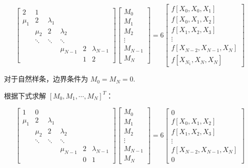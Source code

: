 \documentclass[lang=cn,a4paper,newtx,bibend=bibtex]{elegantpaper}
\begin{document}
\[
\begin{bmatrix}
  2 & 1 & & & & \\
  \mu_1 & 2 & \lambda_1 & & & \\
  & \mu_2 & 2 & \lambda_2 & &\\
  & \ddots & \ddots & \ddots & & \\
  & & & \mu_{N-1} & 2 & \lambda_{N-1} \\
  & & & & 1 & 2
\end{bmatrix}  
\begin{bmatrix}
  M_0 \\
  M_1 \\
  M_2 \\
  \vdots \\
  M_{N-1} \\
  M_N
\end{bmatrix}
 = 6
 \begin{bmatrix}
  f[X_0, X_0, X_1] \\
  f[X_0, X_1, X_2]\\
  f[X_1, X_2, X_3] \\
  \vdots \\
  f[X_{N-2}, X_{N-1}, X_N] \\
  f[X_{N_1}, X_N, X_N]
\end{bmatrix}
\]

对于自然样条，边界条件为 $M_0 = M_N = 0$.

根据下式求解 $[M_0, M_1, \cdots, M_N]^T$：

\[
\begin{bmatrix}
  1 & 0 & & & & \\
  \mu_1 & 2 & \lambda_1 & & & \\
  & \mu_2 & 2 & \lambda_2 & &\\
  & \ddots & \ddots & \ddots & & \\
  & & & \mu_{N-1} & 2 & \lambda_{N-1} \\
  & & & & 0 & 1
\end{bmatrix}  
\begin{bmatrix}
  M_0 \\
  M_1 \\
  M_2 \\
  \vdots \\
  M_{N-1} \\
  M_N
\end{bmatrix}
 = 6
 \begin{bmatrix}
  0\\
  f[X_0, X_1, X_2]\\
  f[X_1, X_2, X_3] \\
  \vdots \\
  f[X_{N-2}, X_{N-1}, X_N] \\
  0
\end{bmatrix}
\]
\end{document}

